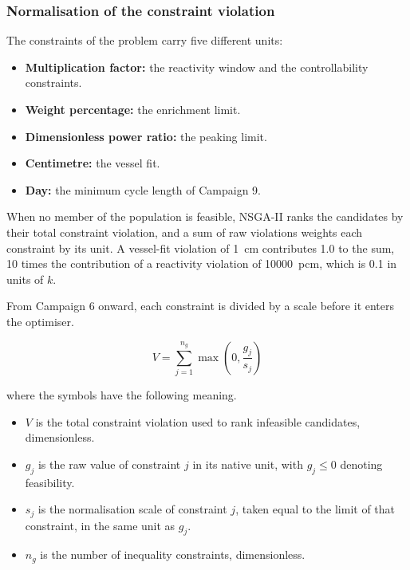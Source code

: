 \subsubsection{Normalisation of the constraint violation}
\label{subsubsec:cv-norm}

The constraints of the problem carry five different units:

\begin{itemize}
  \item \textbf{Multiplication factor:} the reactivity window and the
        controllability constraints.
  \item \textbf{Weight percentage:} the enrichment limit.
  \item \textbf{Dimensionless power ratio:} the peaking limit.
  \item \textbf{Centimetre:} the vessel fit.
  \item \textbf{Day:} the minimum cycle length of Campaign 9.
\end{itemize}

When no member of the population is feasible,
NSGA-II ranks the candidates by their total constraint violation, and a
sum of raw violations weights each constraint by its unit. A vessel-fit
violation of \SI{1}{cm} contributes 1.0 to the sum, 10 times the
contribution of a reactivity violation of \SI{10000}{pcm}, which is 0.1
in units of $k$.

From Campaign 6 onward, each constraint is divided by a scale before it
enters the optimiser.

\begin{equation}
  V = \sum_{j=1}^{n_g} \max\!\left(0, \frac{g_j}{s_j}\right)
  \label{eq:cv-norm}
\end{equation}

\noindent where the symbols have the following meaning.

\begin{itemize}
  \item $V$ is the total constraint violation used to rank infeasible
    candidates, dimensionless.
  \item $g_j$ is the raw value of constraint $j$ in its native unit, with
    $g_j \leq 0$ denoting feasibility.
  \item $s_j$ is the normalisation scale of constraint $j$, taken equal to the
    limit of that constraint, in the same unit as $g_j$.
  \item $n_g$ is the number of inequality constraints, dimensionless.
\end{itemize}

